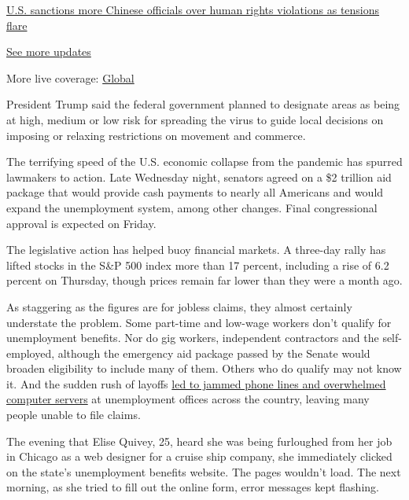 \href{https://www.nytimes.com/live/2020/07/31/business/stock-market-today-coronavirus?action=click\&pgtype=Article\&state=default\&region=MAIN_CONTENT_1\&context=storylines_live_updates\#us-sanctions-more-chinese-officials-over-human-rights-violations-as-tensions-flare}{U.S.
sanctions more Chinese officials over human rights violations as
tensions flare}

\href{https://www.nytimes.com/live/2020/07/31/business/stock-market-today-coronavirus?action=click\&pgtype=Article\&state=default\&region=MAIN_CONTENT_1\&context=storylines_live_updates}{See
more updates}

More live coverage:
\href{https://www.nytimes.com/2020/08/01/world/coronavirus-covid-19.html?action=click\&pgtype=Article\&state=default\&region=MAIN_CONTENT_1\&context=storylines_live_updates}{Global}

President Trump said the federal government planned to designate areas
as being at high, medium or low risk for spreading the virus to guide
local decisions on imposing or relaxing restrictions on movement and
commerce.

The terrifying speed of the U.S. economic collapse from the pandemic has
spurred lawmakers to action. Late Wednesday night, senators agreed on a
\$2 trillion aid package that would provide cash payments to nearly all
Americans and would expand the unemployment system, among other changes.
Final congressional approval is expected on Friday.

The legislative action has helped buoy financial markets. A three-day
rally has lifted stocks in the S\&P 500 index more than 17 percent,
including a rise of 6.2 percent on Thursday, though prices remain far
lower than they were a month ago.

As staggering as the figures are for jobless claims, they almost
certainly understate the problem. Some part-time and low-wage workers
don't qualify for unemployment benefits. Nor do gig workers, independent
contractors and the self-employed, although the emergency aid package
passed by the Senate would broaden eligibility to include many of them.
Others who do qualify may not know it. And the sudden rush of layoffs
\href{https://www.nytimes.com/2020/03/19/business/coronavirus-unemployment-states.html}{led
to jammed phone lines and overwhelmed computer servers} at unemployment
offices across the country, leaving many people unable to file claims.

The evening that Elise Quivey, 25, heard she was being furloughed from
her job in Chicago as a web designer for a cruise ship company, she
immediately clicked on the state's unemployment benefits website. The
pages wouldn't load. The next morning, as she tried to fill out the
online form, error messages kept flashing.

